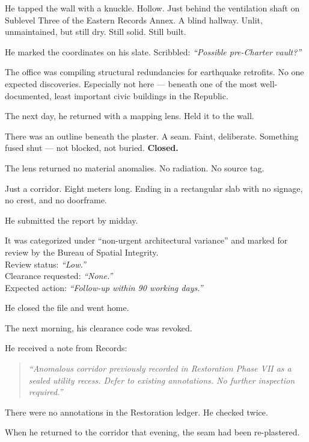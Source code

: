 \documentclass[12pt]{article}
\begin{document}
He tapped the wall with a knuckle. Hollow. Just behind the ventilation shaft on Sublevel Three of the Eastern Records Annex. A blind hallway. Unlit, unmaintained, but still dry. Still solid. Still built.

He marked the coordinates on his slate. Scribbled: \textit{“Possible pre-Charter vault?”}

The office was compiling structural redundancies for earthquake retrofits. No one expected discoveries. Especially not here --- beneath one of the most well-documented, least important civic buildings in the Republic.

The next day, he returned with a mapping lens. Held it to the wall.

There was an outline beneath the plaster. A seam. Faint, deliberate. Something fused shut --- not blocked, not buried. \textbf{Closed.}

The lens returned no material anomalies. No radiation. No source tag.

Just a corridor. Eight meters long. Ending in a rectangular slab with no signage, no crest, and no doorframe.

\vspace{1em}

He submitted the report by midday.

It was categorized under ``non-urgent architectural variance'' and marked for review by the Bureau of Spatial Integrity.\\
Review status: \textit{“Low.”} \\
Clearance requested: \textit{“None.”} \\
Expected action: \textit{“Follow-up within 90 working days.”}

He closed the file and went home.

\vspace{1em}

The next morning, his clearance code was revoked.

He received a note from Records:

\begin{quote}
\textit{“Anomalous corridor previously recorded in Restoration Phase VII as a sealed utility recess. Defer to existing annotations. No further inspection required.”}
\end{quote}

There were no annotations in the Restoration ledger. He checked twice.

When he returned to the corridor that evening, the seam had been re-plastered.
\end{document}
